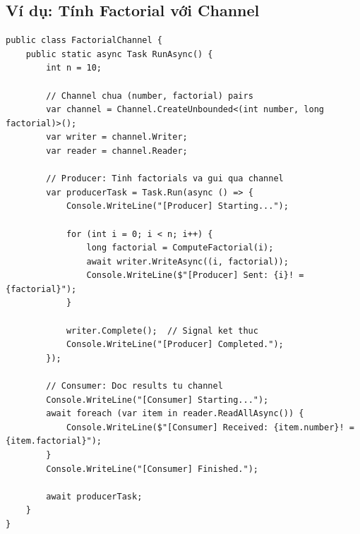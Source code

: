 \subsection{Ví dụ: Tính Factorial với Channel}

\begin{lstlisting}[style=csharpstyle, caption={Factorial với Channel Pattern}, label={lst:factorial_channel}]
public class FactorialChannel {
    public static async Task RunAsync() {
        int n = 10;
        
        // Channel chua (number, factorial) pairs
        var channel = Channel.CreateUnbounded<(int number, long factorial)>();
        var writer = channel.Writer;
        var reader = channel.Reader;
        
        // Producer: Tinh factorials va gui qua channel
        var producerTask = Task.Run(async () => {
            Console.WriteLine("[Producer] Starting...");
            
            for (int i = 0; i < n; i++) {
                long factorial = ComputeFactorial(i);
                await writer.WriteAsync((i, factorial));
                Console.WriteLine($"[Producer] Sent: {i}! = {factorial}");
            }
            
            writer.Complete();  // Signal ket thuc
            Console.WriteLine("[Producer] Completed.");
        });
        
        // Consumer: Doc results tu channel
        Console.WriteLine("[Consumer] Starting...");
        await foreach (var item in reader.ReadAllAsync()) {
            Console.WriteLine($"[Consumer] Received: {item.number}! = {item.factorial}");
        }
        Console.WriteLine("[Consumer] Finished.");
        
        await producerTask;
    }
}
\end{lstlisting}

